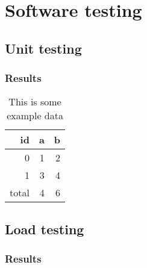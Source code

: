 \chapter{Software testing}
\label{ch:testing}


\section{Unit testing}

\subsection{Results}

\begin{table}[H]
\caption{This is some example data}
\centering
\begin{tabular}{rrr}
\toprule
id & a & b\\
\midrule
0 & 1 & 2\\
1 & 3 & 4\\
\midrule
total & 4 & 6\\
\bottomrule
\end{tabular}
\end{table}

\section{Load testing}

\subsection{Results}

